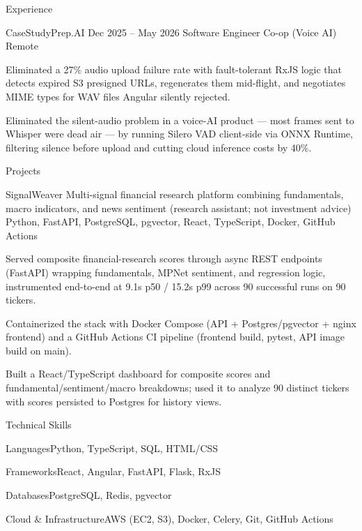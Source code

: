 \documentclass[
	11pt
]{../../../template}
\begin{document}
\begin{rSection}{E}{xperience}
		\begin{rSectionEntry}
			{CaseStudyPrep.AI}
			{Dec 2025 -- May 2026}
			{Software Engineer Co-op (Voice AI)}
			{}
			{Remote}

			\item Eliminated a 27\% audio upload failure rate with fault-tolerant RxJS logic that detects expired S3 presigned URLs, regenerates them mid-flight, and negotiates MIME types for WAV files Angular silently rejected.
			\item Eliminated the silent-audio problem in a voice-AI product — most frames sent to Whisper were dead air — by running Silero VAD client-side via ONNX Runtime, filtering silence before upload and cutting cloud inference costs by 40\%.
		\end{rSectionEntry}
	\end{rSection}

	\begin{rSection}{P}{rojects}
		\begin{rSectionEntry}
			{SignalWeaver}
			{}
			{Multi-signal financial research platform combining fundamentals, macro indicators, and news sentiment (research assistant; not investment advice)}
			{Python, FastAPI, PostgreSQL, pgvector, React, TypeScript, Docker, GitHub Actions}
			{}

			\item Served composite financial-research scores through async REST endpoints (FastAPI) wrapping fundamentals, MPNet sentiment, and regression logic, instrumented end-to-end at 9.1s p50 / 15.2s p99 across 90 successful runs on 90 tickers.
			\item Containerized the stack with Docker Compose (API + Postgres/pgvector + nginx frontend) and a GitHub Actions CI pipeline (frontend build, pytest, API image build on main).
			\item Built a React/TypeScript dashboard for composite scores and fundamental/sentiment/macro breakdowns; used it to analyze 90 distinct tickers with scores persisted to Postgres for history views.
		\end{rSectionEntry}
	\end{rSection}

	\begin{rSection}{T}{echnical Skills}
		\begin{rSet}{Languages}{Python, TypeScript, SQL, HTML/CSS}
		\end{rSet}
		\begin{rSet}{Frameworks}{React, Angular, FastAPI, Flask, RxJS}
		\end{rSet}
		\begin{rSet}{Databases}{PostgreSQL, Redis, pgvector}
		\end{rSet}
		\begin{rSet}{Cloud \& Infrastructure}{AWS (EC2, S3), Docker, Celery, Git, GitHub Actions}
		\end{rSet}
	\end{rSection}
\end{document}
